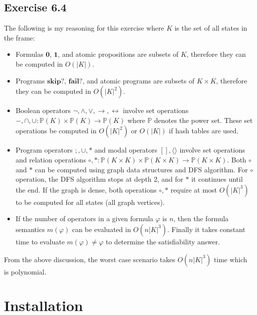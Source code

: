 \documentclass[12pt,a4paper]{article}
\begin{document}
\subsection{Exercise 6.4}

 The following is my reasoning for this exercise where $K$ is the set of all states in the frame:
\begin{itemize}
\item Formulas $\textbf{0}$, $\textbf{1}$, and atomic propositions are subsets of $K$, therefore they can be computed in $O(\vert K \vert)$.
\item Programs $\textbf{skip}?$, $\textbf{fail}?$, and atomic programs are subsets of $K \times K$, therefore they can be computed in $O(\vert K \vert^2)$.

\item Boolean operators $\neg, \wedge, \vee, \rightarrow, \leftrightarrow$ involve set operations $-, \cap, \cup: \mathbb{P}(K) \times \mathbb{P}(K) \rightarrow \mathbb{P}(K)$ where $\mathbb{P}$ denotes the power set. These set operations be computed in $O(\vert K \vert^2)$ or $O(\vert K \vert)$ if hash tables are used.

\item Program operators $;, \cup, *$ and modal operators $[], \langle \rangle$ involve set operations and relation operations $\circ, *: \mathbb{P}(K \times K) \times \mathbb{P}(K \times K) \rightarrow \mathbb{P}(K \times K)$. Both $\circ$ and $*$ can be computed using graph data structures and DFS algorithm. 
For $\circ$ operation, the DFS algorithm stops at depth 2, and for $*$ it continues until the end. 
If the graph is dense, both operations $\circ, *$ require at most $O(\vert K \vert^3)$ to be computed for all states (all graph vertices). 

\item If the number of operators in a given formula $\varphi$ is $n$, then the formula semantics $m(\varphi)$ can be evaluated in $O(n \vert K \vert ^3)$. Finally it takes constant time to evaluate $m(\varphi) \neq \varphi$ to  determine the satisfiability answer. 
\end{itemize}

From the above discussion, the worst case scenario takes $O(n \vert K \vert ^3)$ time which is polynomial. 

\section{Installation}
\end{document}
